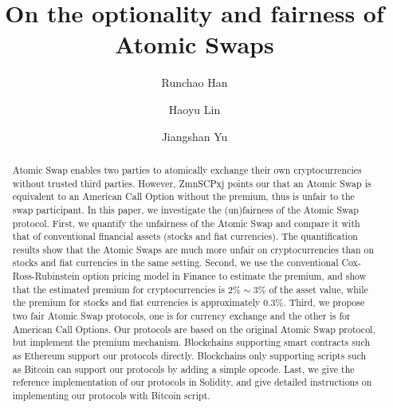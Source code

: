 \documentclass[sigconf, natbib=false]{acmart}
\renewcommand\_{\textunderscore\allowbreak}
\begin{document}
\title{On the optionality and fairness of Atomic Swaps}

\author{Runchao Han}

\author{Haoyu Lin}
\affiliation{%
  \institution{}
}

\author{Jiangshan Yu}

\begin{abstract}
Atomic Swap enables two parties to atomically exchange their own cryptocurrencies without trusted third parties.
However, ZmnSCPxj points our that an Atomic Swap is equivalent to an American Call Option without the premium, thus is unfair to the swap participant.
In this paper, we investigate the (un)fairness of the Atomic Swap protocol.
First, we quantify the unfairness of the Atomic Swap and compare it with that of conventional financial assets (stocks and fiat currencies).
The quantification results show that the Atomic Swaps are much more unfair on cryptocurrencies than on stocks and fiat currencies in the same setting.
Second, we use the conventional Cox-Ross-Rubinstein option pricing model in Finance to estimate the premium, and show that the estimated premium for cryptocurrencies is $2\% \sim 3\%$ of the asset value, while the premium for stocks and fiat currencies is approximately $0.3\%$.
Third, we propose two fair Atomic Swap protocols,
one is for currency exchange and the other is for American Call Options.
Our protocols are based on the original Atomic Swap protocol, but implement the premium mechanism.
Blockchains supporting smart contracts such as Ethereum support our protocols directly.
Blockchains only supporting scripts such as Bitcoin can support our protocols by adding a simple opcode.
Last, we give the reference implementation of our protocols in Solidity, and give detailed instructions on implementing our protocols with Bitcoin script.
\end{abstract}


\maketitle














\printbibliography


\end{document}
